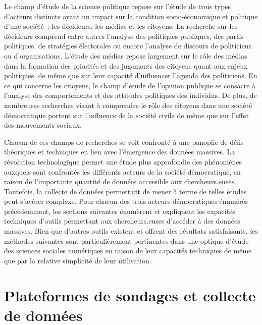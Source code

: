 \documentclass[
  letterpaper,
]{scrbook}
\begin{document}
Le champ d'étude de la science politique repose sur l'étude de trois
types d'acteurs distincts ayant un impact sur la condition
socio-économique et politique d'une société~: les décideurs, les médias
et les citoyens. La recherche sur les décideurs comprend entre autres
l'analyse des politiques publiques, des partis politiques, de stratégies
électorales ou encore l'analyse de discours de politiciens ou
d'organisations. L'étude des médias repose largement sur le rôle des
médias dans la formation des priorités et des jugements des citoyens
quant aux enjeux politiques, de même que sur leur capacité d'influencer
l'agenda des politiciens. En ce qui concerne les citoyens, le champ
d'étude de l'opinion publique se consacre à l'analyse des comportements
et des attitudes politiques des individus. De plus, de nombreuses
recherches visant à comprendre le rôle des citoyens dans une société
démocratique portent sur l'influence de la société civile de même que
sur l'effet des mouvements sociaux.

Chacun de ces champs de recherches se voit confronté à une panoplie de
défis théoriques et techniques en lien avec l'émergence des données
massives. La révolution technologique permet une étude plus approfondie
des phénomènes auxquels sont confrontés les différents acteurs de la
société démocratique, en raison de l'importante quantité de données
accessible aux chercheurs.euses. Toutefois, la collecte de données
permettant de mener à terme de telles études peut s'avérer complexe.
Pour chacun des trois acteurs démocratiques énumérés précédemment, les
sections suivantes énumèrent et expliquent les capacités techniques
d'outils permettant aux chercheurs.euses d'accéder à des données
massives. Bien que d'autres outils existent et offrent des résultats
satisfaisants, les méthodes suivantes sont particulièrement pertinentes
dans une optique d'étude des sciences sociales numériques en raison de
leur capacités techniques de même que par la relative simplicité de leur
utilisation.

\hypertarget{section}{%
\section{}\label{section}}

\hypertarget{plateformes-de-sondages-et-collecte-de-donnuxe9es}{%
\section{Plateformes de sondages et collecte de
données}\label{plateformes-de-sondages-et-collecte-de-donnuxe9es}}
\end{document}
